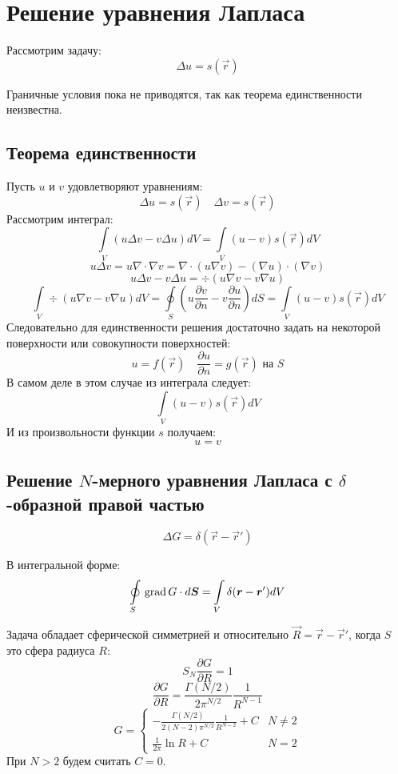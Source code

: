 \section{Решение уравнения Лапласа}

Рассмотрим задачу:
\[
	\Delta u = s(\vec{r})
\]

Граничные условия пока не приводятся, так как теорема единственности неизвестна.

\subsection{Теорема единственности}

Пусть $u$ и $v$ удовлетворяют уравнениям:
\[
	\Delta u = s(\vec{r}) \quad \Delta v = s(\vec{r})
\]
Рассмотрим интеграл:
\[
	\int\limits_V (u \Delta v - v \Delta u) dV = \int\limits_V (u - v) s(\vec{r}) dV
\]
\[
	u \Delta v = u \nabla \cdot \nabla v = \nabla \cdot (u \nabla v) - (\nabla u) \cdot (\nabla v)
\]
\[
	u \Delta v - v \Delta u = \div (u \nabla v - v \nabla u)
\]
\[
	\int\limits_V \div (u \nabla v - v \nabla u) dV = 
	\oint\limits_S \left(u \frac{\partial v}{\partial n} - v \frac{\partial u}{\partial n}\right) dS =
	\int\limits_V (u - v) s(\vec{r}) dV
\]
Следовательно для единственности решения достаточно задать на некоторой поверхности или совокупности поверхностей:
\[
	u = f(\vec{r}) \quad \frac{\partial u}{\partial n} = g(\vec{r}) \text{ на } S
\]
В самом деле в этом случае из интеграла следует:
\[
	\int\limits_V (u - v) s(\vec{r}) dV
\]
И из произвольности функции $s$ получаем:
\[
	u = v
\]

\subsection{Решение $N$-мерного уравнения Лапласа с $\delta$-образной правой частью}

\[
	\Delta G = \delta (\vec{r} - \vec{r}')
\]

В интегральной форме:
\[
	\oint\limits_S \,\mathrm{grad}\, G \cdot d\boldsymbol{S} = \int\limits_V \delta (\boldsymbol{r} - \boldsymbol{r}') dV
\]

Задача обладает сферической симметрией и относительно $\vec{R} = \vec{r} - \vec{r}'$, когда $S$ это сфера радиуса $R$:
\[
	S_N \frac{\partial G}{\partial R} = 1
\]
\[
	\frac{\partial G}{\partial R} = \frac{\Gamma(N/2)}{2 \pi^{N/2}} \frac{1}{R^{N - 1}}
\]
\[
	G = 
	\begin{cases}
	- \frac{\Gamma(N/2)}{2(N - 2) \pi^{N/2}} \frac{1}{R^{N - 2}} + C & N \ne 2 \\
	\frac{1}{2\pi} \ln R + C & N = 2
	\end{cases}
\]
При $N > 2$ будем считать $C = 0$.

